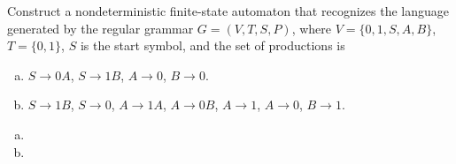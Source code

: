 \documentclass[../main.tex]{subfiles}
\begin{document}
Construct a nondeterministic finite-state automaton that recognizes the language generated by the regular grammar $G = (V, T, S, P)$, where $V = \{0, 1, S, A, B\}$, $T = \{0, 1\}$, $S$ is the start symbol, and the set of productions is
\begin{enumerate}[a)]
	\item $S \rightarrow 0A$, $S \rightarrow 1B$, $A \rightarrow 0$, $B \rightarrow 0$.
	\setcounter{enumi}{2}
	\item $S \rightarrow 1B$, $S \rightarrow 0$, $A \rightarrow 1A$, $A \rightarrow 0B$, $A \rightarrow 1$, $A \rightarrow 0$, $B \rightarrow 1$.
\end{enumerate}

\solution
\begin{enumerate}[a)]
	\item 
	\setcounter{enumi}{2}
	\item 
\end{enumerate}
\end{document}
